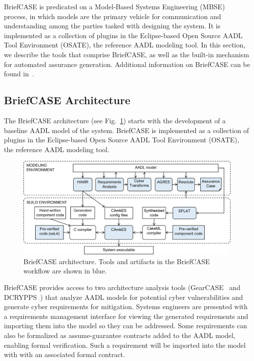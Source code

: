 BriefCASE is predicated on a Model-Based Systems Engineering (MBSE) process, in which models are the primary vehicle for communication and understanding among the parties tasked with designing the system. 
It is implemented as a collection of plugins in the Eclipse-based Open Source AADL Tool Environment (OSATE), the reference AADL modeling tool. In this section, we describe the tools that comprise BriefCASE, as well as the built-in mechanism for automated assurance generation.  Additional information on BriefCASE can be found in~\cite{case-at-scale}.

\subsection{BriefCASE Architecture}

The BriefCASE architecture (see Fig.~\ref{fig:briefcase-architecture}) starts with the development of a baseline AADL model of the system. BriefCASE is implemented as a collection of plugins in the Eclipse-based Open Source AADL Tool Environment (OSATE), the reference AADL modeling tool. 

\begin{figure}[h] 
	\centering 
	\includegraphics[width=\textwidth]{figs/briefcase-architecture.png}
	\caption{BriefCASE architecture. Tools and artifacts in the BriefCASE workflow are shown in blue.}
	\label{fig:briefcase-architecture} 
\end{figure}


BriefCASE provides access to two architecture analysis tools (GearCASE~\cite{gearcase2020} and DCRYPPS~\cite{dcrypps2019}) that analyze AADL models for potential cyber vulnerabilities and generate cyber requirements for mitigation. 
Systems engineers are presented with a requirements management interface for viewing the generated requirements and importing them into the model so they can be addressed.  
Some requirements can also be formalized as assume-guarantee contracts added to the AADL model, enabling formal verification. Such a requirement will be imported into the model with with an associated formal contract.

